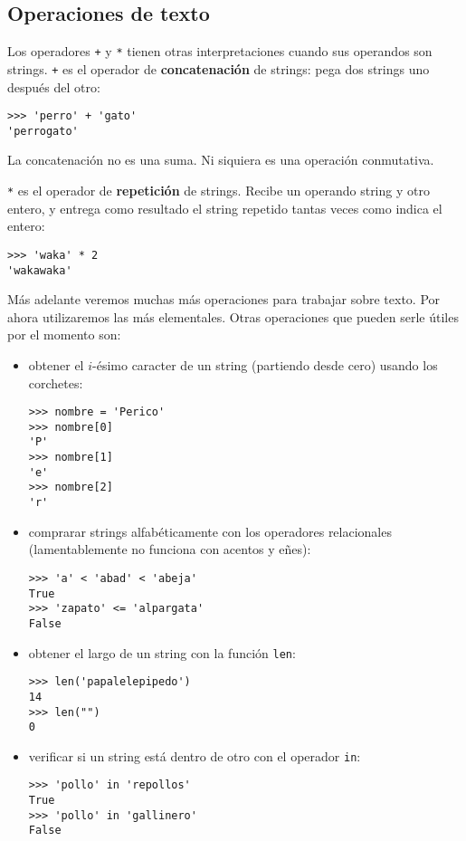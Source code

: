 \subsection{Operaciones de texto}

Los operadores \lstinline!+! y \lstinline!*! tienen otras
interpretaciones cuando sus operandos son strings.
\lstinline!+! es el operador de \textbf{concatenación} de strings: pega
dos strings uno después del otro:
\begin{lstlisting}
>>> 'perro' + 'gato'
'perrogato'
\end{lstlisting}
La concatenación no es una suma. Ni siquiera es una operación
conmutativa.

\lstinline!*! es el operador de \textbf{repetición} de strings. Recibe
un operando string y otro entero, y entrega como resultado el string
repetido tantas veces como indica el entero:

\begin{lstlisting}
>>> 'waka' * 2
'wakawaka'
\end{lstlisting}

Más adelante veremos muchas más operaciones para trabajar sobre texto.
Por ahora utilizaremos las más elementales. Otras operaciones que pueden
serle útiles por el momento son:

\begin{itemize}
\item
  obtener el \(i\)-ésimo caracter de un string (partiendo desde cero)
  usando los corchetes:

\begin{lstlisting}
>>> nombre = 'Perico'
>>> nombre[0]
'P'
>>> nombre[1]
'e'
>>> nombre[2]
'r'
\end{lstlisting}
\item
  comprarar strings alfabéticamente con los operadores relacionales
  (lamentablemente no funciona con acentos y eñes):

\begin{lstlisting}
>>> 'a' < 'abad' < 'abeja'
True
>>> 'zapato' <= 'alpargata'
False
\end{lstlisting}
\item
  obtener el largo de un string con la función \lstinline!len!:

\begin{lstlisting}
>>> len('papalelepipedo')
14
>>> len("")
0
\end{lstlisting}
\item
  verificar si un string está dentro de otro con el operador
  \lstinline!in!:

\begin{lstlisting}
>>> 'pollo' in 'repollos'
True
>>> 'pollo' in 'gallinero'
False
\end{lstlisting}
\end{itemize}

